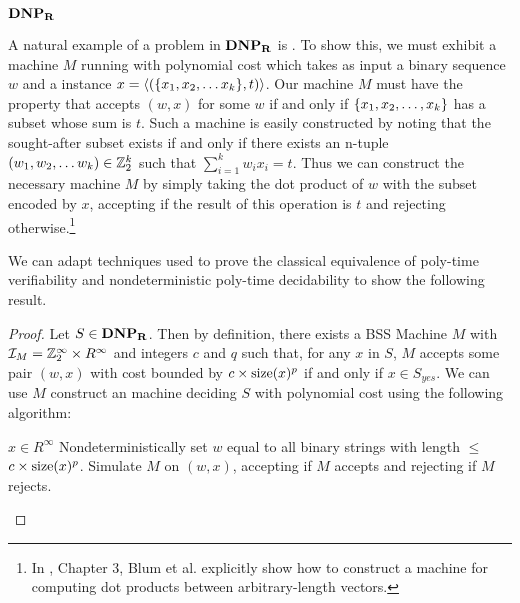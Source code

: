 {\begin{definition}{\textbf{$\mathbf{DNP_R}$}}
\end{definition}

\begin{example}

  A natural example of a problem in $\mathbf{DNP_R}$ is \subsum.  To show this,
  we must exhibit a machine $M$ running with polynomial cost which
  takes as input a binary sequence $w$ and a \subsum instance $x =
  \langle (\{x_1, x_2, \ldots x_k\}, t) \rangle$.  Our machine $M$
  must have the property that accepts $(w,x)$ for some $w$ if and only
  if $\{x_1, x_2, \ldots, x_k\}$ has a subset whose sum is $t$.
  Such a machine is easily constructed by noting that the sought-after
  subset exists if and only if there exists an n-tuple $(w_1, w_2,
  \ldots w_k) \in \mathbb{Z}_2^k$ such that $\sum\limits_{i=1}^k w_ix_i
  = t$.  Thus we can construct the necessary machine $M$ by simply
  taking the dot product of $w$ with the subset encoded by $x$,
  accepting if the result of this operation is $t$ and rejecting
  otherwise.\footnote{In \cite{B98}, Chapter 3, Blum et al. explicitly
    show how to construct a machine for computing dot products between
    arbitrary-length vectors.}
  
\end{example}

We can adapt techniques used to prove the classical equivalence of
poly-time verifiability and nondeterministic poly-time decidability to
show the following result.

\theorem{$\dnp = \ndetp$}

\begin{proof}

  Let $S \in \mathbf{DNP_R}$.  Then by definition, there exists a BSS Machine
  $M$ with $\mathcal{I}_M = \mathbb{Z}_2^\infty \times R^\infty$ and
  integers $c$ and $q$ such that, for any $x$ in $S$, $M$ accepts some
  pair $(w,x)$ with cost bounded by $c \times \text{size}(x)^p$ if and only
  if $x \in S_{yes}$.  We can use $M$ construct an \ndet machine
  deciding $S$ with polynomial cost using the following algorithm:

  \begin{algorithm}
    \caption{$\dnp \rightarrow \ndetp$} \label{alg:dnp->ndet}
    \begin{algorithmic}
      \Require $x \in R^\infty$ 
      \State Nondeterministically set $w$
      equal to all binary strings with length $\leq$ $c \times
      \text{size}(x)^p$.
      \State Simulate $M$ on $(w,x)$, accepting if $M$ accepts and rejecting if $M$ rejects.
    \end{algorithmic}
  \end{algorithm}
\end{proof}

}
